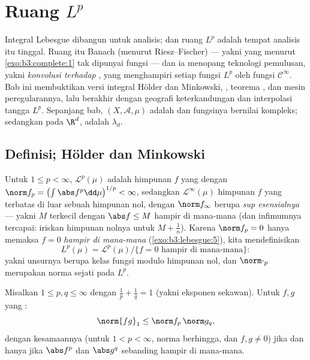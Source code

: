 \chapter{Ruang \texorpdfstring{$L^p$}{Lp}}\label{ch:b3:lp}

Integral Lebesgue dibangun untuk analisis; dan ruang $L^p$
adalah tempat analisis itu tinggal. Ruang itu Banach
(menurut Riesz--Fischer) --- yakni  yang menurut
\cref{exo:b3:complete:1} tak dipunyai fungsi
 --- dan ia menopang teknologi pemulusan,
yakni \emph{konvolusi terhadap }, yang menghampiri setiap
fungsi $L^p$ oleh fungsi $\mathcal C^\infty$. Bab ini membuktikan
versi integral Hölder dan Minkowski, ,
teorema , dan mesin peregularannya, lalu berakhir
dengan geografi keterkandungan dan interpolasi tangga
$L^p$. Sepanjang bab, $(X, \mathcal A, \mu)$ adalah 
dan fungsinya bernilai kompleks; sedangkan pada $\R^d$,  adalah
$\lambda_d$.

\section{Definisi; Hölder dan Minkowski}

\begin{definition}\label{def:b3:lp:space}
Untuk $1 \leq p < \infty$, $\mathcal L^p(\mu)$ adalah himpunan
$f$ yang  dengan $\norm f_p = \bigl(\int\abs
f^p\dd\mu\bigr)^{1/p} < \infty$, sedangkan $\mathcal L^\infty(\mu)$
himpunan $f$ yang terbatas di luar sebuah himpunan nol, dengan $\norm
f_\infty$ berupa \emph{sup esensialnya} --- yakni $M$ terkecil dengan
$\abs f \leq M$ hampir di mana-mana (dan infimumnya tercapai: iriskan himpunan
nolnya untuk $M + \frac1n$). Karena $\norm f_p = 0$ hanya memaksa $f
= 0$ \emph{hampir di mana-mana} (\cref{exo:b3:lebesgue:5}), kita mendefinisikan
\[
L^p(\mu) = \mathcal L^p(\mu)/\{f = 0 \text{ hampir di mana-mana}\} :
\]
yakni unsurnya berupa kelas fungsi modulo himpunan nol, dan
$\norm\cdot_p$ merupakan norma sejati pada
$L^p$.
\end{definition}

\begin{theorem}\label{thm:b3:lp:holder}
Misalkan $1 \leq p, q \leq \infty$ dengan $\frac1p + \frac1q = 1$
(yakni eksponen sekawan). Untuk $f, g$ yang :
\[
\norm{fg}_1 \leq \norm f_p\,\norm g_q ,
\]
dengan kesamaannya (untuk $1 < p < \infty$, norma berhingga, dan $f,g\ne0$)
jika dan hanya jika $\abs f^p$ dan $\abs g^q$ sebanding hampir di mana-mana.
\end{theorem}

